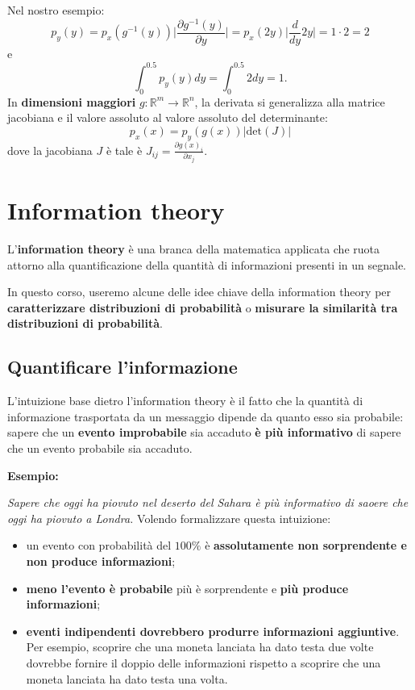 Nel nostro esempio:
\begin{equation}
    p_y(y)=p_x(g^{-1}(y))\Big| \frac{\partial g^{-1}(y)}{\partial y} \Big|=p_x(2y)\Big| \frac{d}{dy}2y\Big|=1\cdot2=2
\end{equation}
e
\begin{equation}
    \int_0^{0.5}p_y(y)dy=\int_0^{0.5}2dy=1.
\end{equation}
In \textbf{dimensioni maggiori} $g:\mathbb{R}^m\rightarrow\mathbb{R}^n$, la derivata si generalizza alla matrice jacobiana e il valore assoluto al valore assoluto del determinante:
\begin{equation}
    p_x(x)=p_y(g(x))|\text{det}(J)|
\end{equation}
dove la jacobiana $J$ è tale è $J_{ij}=\frac{\partial g(x)_i}{\partial x_j}$.







\newpage
\section{Information theory}
L'\textbf{information theory} è una branca della matematica applicata che ruota attorno alla quantificazione della quantità di informazioni presenti in un segnale.


In questo corso, useremo alcune delle idee chiave della information theory per \textbf{caratterizzare distribuzioni di probabilità} o \textbf{misurare la similarità tra distribuzioni di probabilità}.


\subsection{Quantificare l'informazione}
L'intuizione base dietro l'information theory è il fatto che la quantità di informazione trasportata da un messaggio dipende da quanto esso sia probabile: sapere che un \textbf{evento improbabile} sia accaduto \textbf{è più informativo} di sapere che un evento probabile sia accaduto.


\textbf{Esempio:}



\textit{Sapere che oggi ha piovuto nel deserto del Sahara è più informativo di saoere che oggi ha piovuto a Londra.}
\newline
\newline
Volendo formalizzare questa intuizione:
\begin{itemize}
    \item un evento con probabilità del $100\%$ è \textbf{assolutamente non sorprendente e non produce informazioni};
    \item \textbf{meno l'evento è probabile} più è sorprendente e \textbf{più produce informazioni};
    \item \textbf{eventi indipendenti dovrebbero produrre informazioni aggiuntive}. Per esempio, scoprire che una moneta lanciata ha dato testa due volte dovrebbe fornire il doppio delle informazioni rispetto a scoprire che una moneta lanciata ha dato testa una volta.
\end{itemize}
\newpage
